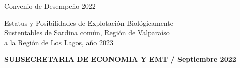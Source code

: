 \documentclass[12pt, oneside]{article} %
\begin{document}
\begin{titlepage}
\centering \fontsize{9pt}{8pt}\selectfont
            \vspace*{-3mm} 
            \hfill Convenio de Desempeño 2022 
            
\centering \fontsize{9pt}{8pt}\selectfont
            \vspace*{-16mm} 
            \hfill \begin{flushright}
            Estatus y Posibilidades de Explotación Biológicamente \\
            Sustentables de Sardina común, Región de Valparaíso \\ 
            a la Región de Los Lagos, año 2023 \\
              \end{flushright} 
            \vspace*{-5mm} 
            \hfill \textbf{SUBSECRETARIA DE ECONOMIA Y EMT / Septiembre 2022}



\end{titlepage}
\end{document}
